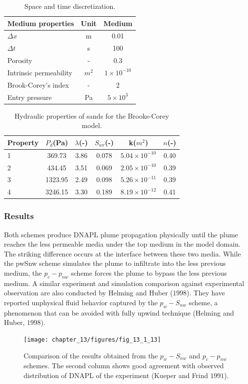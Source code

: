 \begin{table}[!htb]
\begin{center}
\begin{tabular}{lcc}
\hline
Medium properties & Unit & Medium\\
\hline
$\Delta x$ & m &	0.01 \\
$\Delta t$ & s &	100 \\
Porosity & - &	0.3 \\
Intrinsic permeability & $m^2$ & $1\times10^{-10}$ \\
Brook-Corey's index &	- &	2 \\
Entry pressure & Pa & $5\times10^3$ \\
\hline
\end{tabular}
\caption{Space and time discretization.}
\end{center}
\end{table}

\begin{table}[!htb]
\begin{center}
\begin{tabular}{lccccc}
\hline
Property & $P_d$(Pa) & $\lambda$(-) &	$S_{wr}$(-) &	k($m^2$) &	$n$(-) \\
\hline
1	& 369.73 & 3.86	& 0.078	& $5.04\times10^{-10}$ & 0.40 \\ 
2	& 434.45 & 3.51 & 0.069 &	$2.05\times10^{-10}$ & 0.39 \\
3	& 1323.95 &	2.49 & 0.098 &	$5.26\times10^{-11}$ & 0.39 \\
4	& 3246.15	& 3.30 & 0.189 & $8.19\times10^{-12}$ &	0.41 \\
\hline
\end{tabular}
\caption{Hydraulic properties of sands for the Brooks-Corey model.}
\end{center}
\end{table}

\subsubsection*{Results}
Both schemes produce DNAPL plume propagation physically until the plume reaches the less permeable media under the top medium in the model domain. The striking difference occurs at the interface between these two media. While the pwSnw scheme simulates the plume to infiltrate into the less previous medium, the $p_c-p_{nw}$ scheme forces the plume to bypass the less previous medium. A similar experiment and simulation comparison against experimental observation are also conducted by Helming and Huber ($1998$). They have reported unphysical fluid behavior captured by the $p_w-S_{nw}$ scheme, a phenomenon that can be avoided with fully upwind technique (Helming and Huber, $1998$). 

\begin{figure}[!tbh]
\begin{center}
\texttt{[image: chapter\_13/figures/fig\_13\_1\_13]}
\end{center}
\caption{Comparison of the results obtained from the $p_w-S_{nw}$ and $p_c-p_{nw}$ schemes. The second column shows good agreement with observed distribution of DNAPL of the experiment (Kueper and Frind $1991$).}
\label{mcwt:keuperresults}
\end{figure}